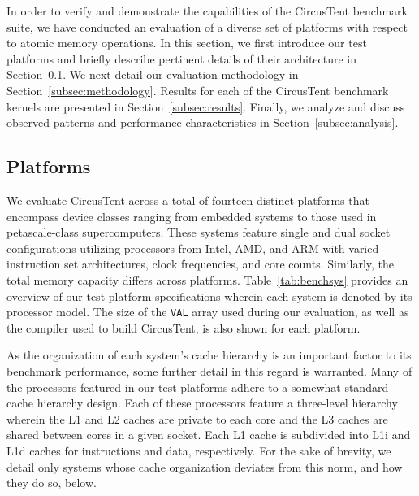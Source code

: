 
In order to verify and demonstrate the capabilities of the CircusTent benchmark suite, we have conducted an evaluation of a diverse set of platforms with respect to atomic memory operations.
In this section, we first introduce our test platforms and briefly describe pertinent details of their architecture in Section~\ref{subsec:platforms}.
We next detail our evaluation methodology in Section~\ref{subsec:methodology}.
Results for each of the CircusTent benchmark kernels are presented in Section~\ref{subsec:results}.
Finally, we analyze and discuss observed patterns and performance characteristics in Section~\ref{subsec:analysis}.

\subsection{Platforms}
\label{subsec:platforms}

We evaluate CircusTent across a total of fourteen distinct platforms that encompass device classes ranging from embedded systems to those used in petascale-class supercomputers.
These systems feature single and dual socket configurations utilizing processors from Intel, AMD, and ARM with varied instruction set architectures, clock frequencies, and core counts.
Similarly, the total memory capacity differs across platforms.
Table~\ref{tab:benchsys} provides an overview of our test platform specifications wherein each system is denoted by its processor model.
The size of the \texttt{VAL} array used during our evaluation, as well as the compiler used to build CircusTent, is also shown for each platform.

As the organization of each system's cache hierarchy is an important factor to its benchmark performance, some further detail in this regard is warranted.
Many of the processors featured in our test platforms adhere to a somewhat standard cache hierarchy design.
Each of these processors feature a three-level hierarchy wherein the L1 and L2 caches are private to each core and the L3 caches are shared between cores in a given socket.
Each L1 cache is subdivided into L1i and L1d caches for instructions and data, respectively.
For the sake of brevity, we detail only systems whose cache organization deviates from this norm, and how they do so, below.

